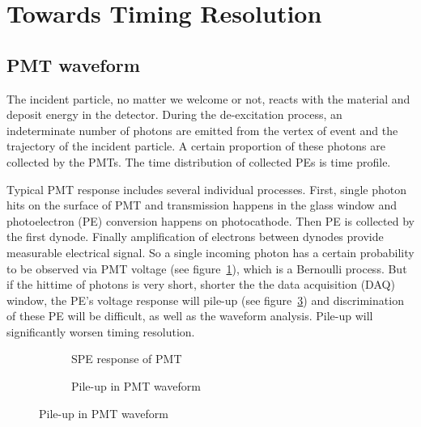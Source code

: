 \section{Towards Timing Resolution} %
\label{sec:toyMC}

\subsection{PMT waveform}

The incident particle, no matter we welcome or not, reacts with the material and deposit energy in the detector. During the de-excitation process, an indeterminate number of photons are emitted from the vertex of event and the trajectory of the incident particle. A certain proportion of these photons are collected by the PMTs. The time distribution of collected PEs is time profile. 

Typical PMT response includes several individual processes. First, single photon hits on the surface of PMT and transmission happens in the glass window and photoelectron (PE) conversion happens on photocathode. Then PE is collected by the first dynode. Finally amplification of electrons between dynodes provide measurable electrical signal. So a single incoming photon has a certain probability to be observed via PMT voltage (see figure~\ref{fig:spe}), which is a Bernoulli process. But if the hittime of photons is very short, shorter the the data acquisition (DAQ) window, the PE's voltage response will pile-up (see figure~\ref{fig:pile}) and discrimination of these PE will be difficult, as well as the waveform analysis. Pile-up will significantly worsen timing resolution. 

\begin{figure}[H]
\begin{minipage}[b]{.5\textwidth}
\begin{figure}[H]
    \centering
    \resizebox{\textwidth}{!}{}
    \caption{\label{fig:spe} SPE response of PMT}
\end{figure}
\end{minipage}
\begin{minipage}[b]{.5\textwidth}
\begin{figure}[H]
    \centering
    \resizebox{\textwidth}{!}{}
    \caption{\label{fig:pile} Pile-up in PMT waveform}
\end{figure}
\end{minipage}
\end{figure}

